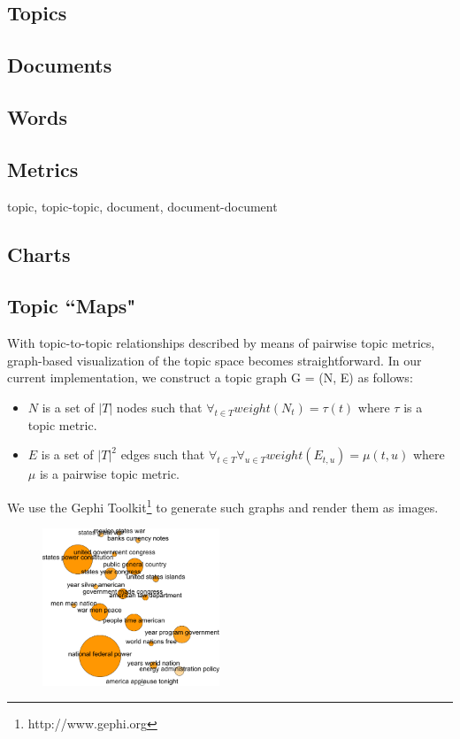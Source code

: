 \subsection{Topics}

\subsection{Documents}

\subsection{Words}

\subsection{Metrics}
topic, topic-topic, document, document-document

\subsection{Charts}



\subsection{Topic ``Maps"}
With topic-to-topic relationships described by means of pairwise topic metrics,
graph-based visualization of the topic space becomes straightforward. In our
current implementation, we construct a topic graph G = (N, E) as follows:
\begin{itemize}
\item $N$ is a set of $|T|$ nodes such that $\forall_{t\in T} weight(N_{t}) =
\tau(t)$ where $\tau$ is a topic metric.
\item $E$ is a set of $|T|^2$ edges such that $\forall_{t\in T}\forall_{u\in T}
weight(E_{t,u}) = \mu(t,u)$ where $\mu$ is a pairwise topic metric.
\end{itemize}

We use the Gephi Toolkit\footnote{http://www.gephi.org} to generate such graphs
and render them as images.
\begin{figure}
  \begin{center}
  \includegraphics[width=200px,keepaspectratio=true]{./topic_map_example.png}
  \caption{}
  \end{center}
\end{figure}

